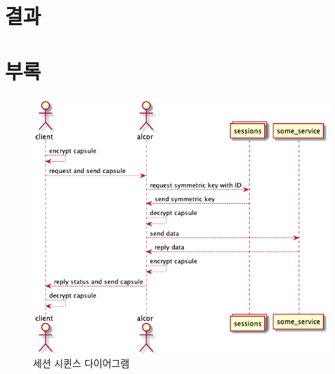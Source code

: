 \documentclass[8pt,a4paper,left=8mm,right=8mm,top=10mm,bottom=10mm]{article}
\begin{document}
\newpage
\section{결과}

\subsection{}

\newpage
\section{부록}

    \begin{figure}[h]
        \begin{center}
            \includegraphics[width=14cm]{sessions}
            \caption{세션 시퀸스 다이어그램}
        \end{center}
    \end{figure}
\end{document}
